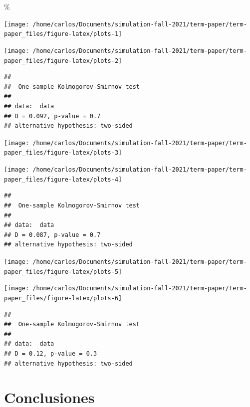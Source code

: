 \documentclass[9pt,twocolumn,twoside,]{pnas-new}
\begin{document}
\%

\begin{flushleft}\texttt{[image: /home/carlos/Documents/simulation-fall-2021/term-paper/term-paper\_files/figure-latex/plots-1]} \end{flushleft}

\begin{flushleft}\texttt{[image: /home/carlos/Documents/simulation-fall-2021/term-paper/term-paper\_files/figure-latex/plots-2]} \end{flushleft}

\begin{verbatim}
## 
##  One-sample Kolmogorov-Smirnov test
## 
## data:  data
## D = 0.092, p-value = 0.7
## alternative hypothesis: two-sided
\end{verbatim}

\begin{flushleft}\texttt{[image: /home/carlos/Documents/simulation-fall-2021/term-paper/term-paper\_files/figure-latex/plots-3]} \end{flushleft}

\begin{flushleft}\texttt{[image: /home/carlos/Documents/simulation-fall-2021/term-paper/term-paper\_files/figure-latex/plots-4]} \end{flushleft}

\begin{verbatim}
## 
##  One-sample Kolmogorov-Smirnov test
## 
## data:  data
## D = 0.087, p-value = 0.7
## alternative hypothesis: two-sided
\end{verbatim}

\begin{flushleft}\texttt{[image: /home/carlos/Documents/simulation-fall-2021/term-paper/term-paper\_files/figure-latex/plots-5]} \end{flushleft}

\begin{flushleft}\texttt{[image: /home/carlos/Documents/simulation-fall-2021/term-paper/term-paper\_files/figure-latex/plots-6]} \end{flushleft}

\begin{verbatim}
## 
##  One-sample Kolmogorov-Smirnov test
## 
## data:  data
## D = 0.12, p-value = 0.3
## alternative hypothesis: two-sided
\end{verbatim}

\hypertarget{conclusiones}{%
\section*{Conclusiones}\label{conclusiones}}
\end{document}
